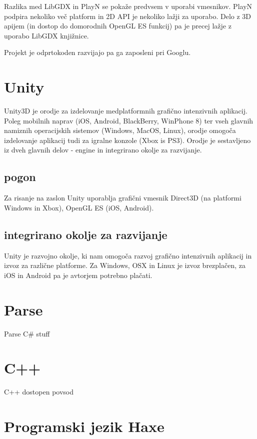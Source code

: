 Razlika med LibGDX in PlayN se pokaže predvsem v uporabi vmesnikov. PlayN podpira nekoliko več platform in 2D API je nekoliko lažji za uporabo. Delo z 3D apijem (in dostop do domorodnih OpenGL ES funkcij) pa je precej lažje z uporabo LibGDX knjižnice. 

Projekt je odprtokoden razvijajo pa ga zaposleni pri Googlu.

\section{Unity\cite{unity}}

Unity3D je orodje za izdelovanje medplatformnih grafično intenzivnih aplikacij. Poleg mobilnih naprav (iOS, Android, BlackBerry, WinPhone 8) ter vseh glavnih namiznih operacijskih sistemov (Windows, MacOS, Linux), orodje omogoča izdelovanje aplikacij tudi za igralne konzole (Xbox is PS3). Orodje je sestavljeno iz dveh glavnih delov - engine in integrirano okolje za razvijanje.

\subsection{pogon}

Za risanje na zaslon Unity uporablja grafični vmesnik Direct3D (na platformi Windows in Xbox), OpenGL ES (iOS, Android). 

\subsection{integrirano okolje za razvijanje} 


Unity je razvojno okolje, ki nam omogoča razvoj grafično intenzivnih aplikacij in izvoz za različne platforme. Za Windows, OSX in Linux je izvoz brezplačen, za iOS in Android pa je avtorjem potrebno plačati.

\section{Parse\cite{parse}}

Parse C\# stuff

\section{C++}

C++ dostopen povsod

\section{Programski jezik Haxe}

